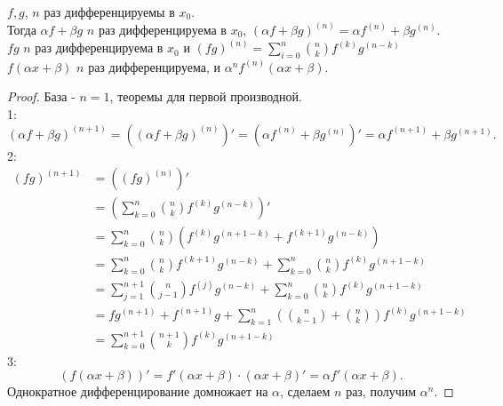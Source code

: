 \documentclass[11pt, oneside]{article}   	%
\begin{document}
    \begin{theorem}
        $f,g$,  $n$ раз дифференцируемы в $x_0$.\\
        Тогда $\alpha f + \beta g$ $n$ раз дифференцируема в $x_0$, $(\alpha f + \beta g)^{(n)} = \alpha f^{(n)} + \beta g^{(n)}$.\\
        $fg$  $n$ раз дифференцируема в $x_0$ и $(fg)^{(n)} = \sum\limits_{i=0}^{n} \binom{n}{k}f^{(k)}g^{(n-k)}$ \\
        $f(\alpha x + \beta)$  $n$ раз дифференцируема, и $\alpha^{n} f^{(n)}(\alpha x + \beta)$.\\
        \begin{proof}
            База - $n=1$, теоремы для первой производной.\\
            1:
            \[ (\alpha f + \beta g)^{(n+1)} = ((\alpha f + \beta g)^{(n)})' = (\alpha f^{(n)} + \beta g^{(n)})' = \alpha f^{(n+1)} + \beta g^{(n+1)}.\]
            2:
            \begin{equation*}
                \begin{split}
                    (fg)^{(n+1)} &= ((fg)^{(n)})'\\
                                 &= \left( \sum\limits_{k=0}^{n}\binom{n}{k}f^{(k)}g^{(n-k)} \right) '\\
                                 &= \sum\limits_{k=0}^{n}\binom{n}{k}\left(f^{(k)}g^{(n+1-k)}+f^{(k+1)}g^{(n-k)}\right)\\
                                 &= \sum\limits_{k=0}^{n}\binom{n}{k}f^{(k+1)}g^{(n-k)} + \sum\limits_{k=0}^{n}\binom{n}{k}f^{(k)}g^{(n+1-k)}\\
                                 &= \sum\limits_{j=1}^{n+1}\binom{n}{j-1}f^{(j)}g^{(n-k)} + \sum\limits_{k=0}^{n}\binom{n}{k}f^{(k)}g^{(n+1-k)}\\
                                 &= fg^{(n+1)} + f^{(n+1)}g + \sum\limits_{k=1}^{n}(\binom{n}{k-1}+\binom{n}{k})f^{(k)}g^{(n+1-k)}\\
                                 &= \sum\limits_{k=0}^{n+1}\binom{n+1}{k}f^{(k)}g^{(n+1-k)}
                \end{split}
            \end{equation*}
            3:
            \[ (f(\alpha x + \beta))' = f'(\alpha x + \beta) \cdot (\alpha x + \beta)' = \alpha f'(\alpha x + \beta) .\]
            Однократное дифференцирование домножает на $\alpha$, сделаем $n$ раз, получим $\alpha^{n}$.
        \end{proof}
    \end{theorem}
\end{document}
